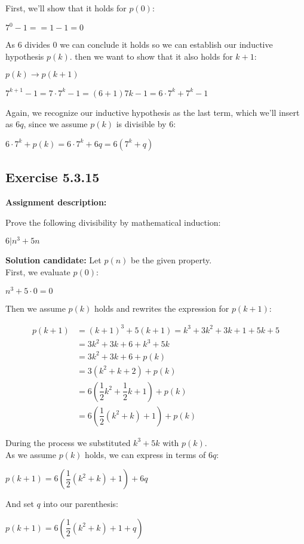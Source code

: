 \documentclass{report}
\newcommand{\cent}[1]{\begin{center}#1\end{center}}
\newcommand{\mAlign}[1]{\begin{align*}#1\end{align*}}
\newcommand{\assignmentDescription}{\textbf{Assignment description: }}
\newcommand{\solution}{\textbf{Solution candidate: }}
\newcommand{\QED}{\boxed{}}
\newcommand{\Exercise}[1]{\subsection{Exercise #1}}
\newcommand{\parenthesis}[1]{\left( #1 \right)}
\begin{document}
 	First, we'll show that it holds for $p(0)$:
 	
 	\cent{$7^0-1 = = 1 - 1 =  0$}
 	
 	As $6$ divides $0$ we can conclude it holds so we can establish our inductive hypothesis $p(k)$. then we want to show that it also holds for $k+1$:
 	
 	\cent{$p(k) \to p(k+1)$}
 	
 	\cent{$7^{k+1}-1 = 7 \cdot 7^k - 1 = (6+1) 7k - 1 = 6 \cdot 7^k + 7^k - 1$}
 	
 	Again, we recognize our inductive hypothesis as the last term, which we'll insert as $6q$, since we assume $p(k)$ is divisible by 6:
 	
 	\cent{$6 \cdot 7^k + p(k) = 6 \cdot 7^k + 6q = 6(7^k + q)$}
 	
 	\QED
 	
 	\Exercise{5.3.15}
 	
 	\assignmentDescription
 	
 	Prove the following divisibility by mathematical induction:
 	
 	\cent{$6|n^3+5n$}
 	
 	\solution
 	Let $p(n)$ be the given property.\\
 	
 	First, we evaluate $p(0)$:
 	
 	\cent{$n^3 +5 \cdot 0 = 0$}
 	
 	Then we assume $p(k)$ holds and rewrites the expression for $p(k+1)$:
 	
 	\mAlign{
 		p(k+1) &= (k+1)^3 + 5(k+1) = k^3 + 3k^2 + 3k + 1 + 5k+5 \\
 		&= 3k^2 + 3k + 6 + k^3 + 5k \\
 		&= 3k^2 + 3k + 6 + p(k) \\
 		&= 3(k^2+k + 2 ) + p(k)\\
 		&= 6\parenthesis{\dfrac{1}{2}k^2 + \dfrac{1}{2}k + 1} + p(k) \\
 		&= 6\parenthesis{\dfrac{1}{2}\parenthesis{k^2 + k} + 1} + p(k)
 	}
 
 	During the process we substituted $k^3+5k$ with $p(k)$.\\
 	
 	As we assume $p(k)$ holds, we can express in terms of $6q$:
 
 	\cent{$ p(k+1) = 6\parenthesis{\dfrac{1}{2}\parenthesis{k^2 + k} + 1} + 6q$}
 	
 	And set $q$ into our parenthesis:
 	
 	\cent{$p(k+1) = 6\parenthesis{\dfrac{1}{2}\parenthesis{k^2 + k} +1+ q}$}
 	
\end{document}
